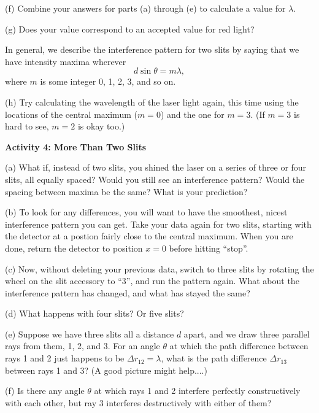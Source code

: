 (f) Combine your answers for parts (a) through (e) to calculate a value for $\lambda$.  
\answerspace{1in}

(g) Does your value correspond to an accepted value for red light?
\answerspace{0.3in}

In general, we describe the interference pattern for two slits by saying that we have intensity maxima wherever 
\begin{displaymath}
d \sin \theta = m \lambda,
\end{displaymath}
where $m$ is some integer 0, 1, 2, 3, and so on.  

(h) Try calculating the wavelength of the laser light again, this time using the locations of the central maximum ($m=0$) and the one for $m=3$.  (If $m=3$ is hard to see, $m=2$ is okay too.)
\answerspace{1.0in}


\pagebreak[2]
\textbf{Activity 4: More Than Two Slits}

(a) What if, instead of two slits, you shined the laser on a series of three or four slits, all equally spaced?  Would you still see an interference pattern?  Would the spacing between maxima be the same?  What is your prediction?
\answerspace{1in}

(b) To look for any differences, you will want to have the smoothest, nicest interference pattern you can get.  Take your data again for two slits, starting with the detector at a postion fairly close to the central maximum.  When you are done, return the detector to position $x=0$ before hitting ``stop''.  

(c) Now, without deleting your previous data, switch to three slits by rotating the wheel on the slit accessory 
to ``3'', and run the pattern again.  What about the interference pattern has changed, and what has stayed the same?
\answerspace{0.8in}

(d) What happens with four slits?  Or five slits?
\answerspace{0.8in}

(e) Suppose we have three slits all a distance $d$ apart, and we draw three parallel rays from them, 1, 2, and 3.  For an angle $\theta$ at which the path difference between rays 1 and 2 just happens to be $\Delta r_{12} = \lambda$, what is the path difference $\Delta r_{13}$ between rays 1 and 3?  (A good picture might help....)
\answerspace{1.5in}

(f) Is there any angle $\theta$ at which rays 1 and 2 interfere perfectly constructively with each other,  but ray 3 interferes destructively with either of them?
\answerspace{0.4in}

